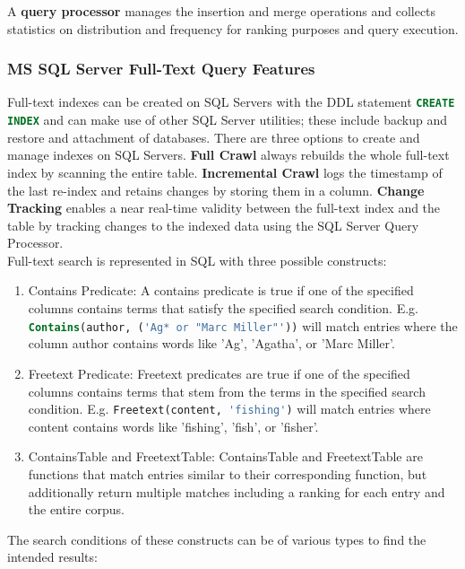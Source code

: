 A \textbf{query processor} manages the insertion and merge operations and collects statistics on distribution and frequency for ranking purposes and query execution. \parencite[cf.][pp. 8-9]{hamilton_microsoft_2001}
\subsubsection{MS SQL Server Full-Text Query Features}
Full-text indexes can be created on \ac{SQL} Servers with the \ac{DDL} statement \lstinline[language=SQL]$CREATE INDEX$ and can make use of other \ac{SQL} Server utilities; these include backup and restore and attachment of databases. There are three options to create and manage indexes on \ac{SQL} Servers. \textbf{Full Crawl} always rebuilds the whole full-text index by scanning the entire table. \textbf{Incremental Crawl} logs the timestamp of the last re-index and retains changes by storing them in a column. \textbf{Change Tracking} enables a near real-time validity between the full-text index and the table by tracking changes to the indexed data using the \ac{SQL} Server Query Processor. \parencite[cf.][p. 9]{hamilton_microsoft_2001}\\
Full-text search is represented in \ac{SQL} with three possible constructs: \parencite[cf.][p. 9]{hamilton_microsoft_2001}
\begin{enumerate}
    \item Contains Predicate: A contains predicate is true if one of the specified columns contains terms that satisfy the specified search condition. E.g. \lstinline[language=SQL]$Contains(author, ('Ag* or "Marc Miller"'))$ will match entries where the column author contains words like 'Ag', 'Agatha', or 'Marc Miller'.
    \item Freetext Predicate: Freetext predicates are true if one of the specified columns contains terms that stem from the terms in the specified search condition. E.g. \lstinline[language=SQL]$Freetext(content, 'fishing')$ will match entries where content contains words like 'fishing', 'fish', or 'fisher'.
    \item ContainsTable and FreetextTable: ContainsTable and FreetextTable are functions that match entries similar to their corresponding function, but additionally return multiple matches including a ranking for each entry and the entire corpus.
\end{enumerate}
The search conditions of these constructs can be of various types to find the intended results: \parencite[cf.][p. 9]{hamilton_microsoft_2001}
